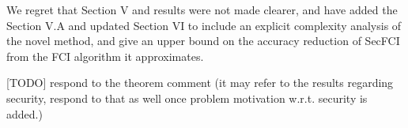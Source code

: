 \documentclass[a4paper]{scrartcl}
\newenvironment{rebuttal}{\begin{enumerate}[label={\color{grey}\thesection.\arabic{enumi}},leftmargin=0pt,ref=\thesection.\arabic{enumi}]}{\end{enumerate}}
\begin{document}
\begin{rebuttal}
We regret that Section V and results were not made clearer, and have added the Section V.A and updated Section VI to include an explicit complexity analysis of the novel method, and give an upper bound on the accuracy reduction of SecFCI from the FCI algorithm it approximates.

[TODO] respond to the theorem comment (it may refer to the results regarding security, respond to that as well once problem motivation w.r.t. security is added.)

\end{rebuttal}

\end{document}
